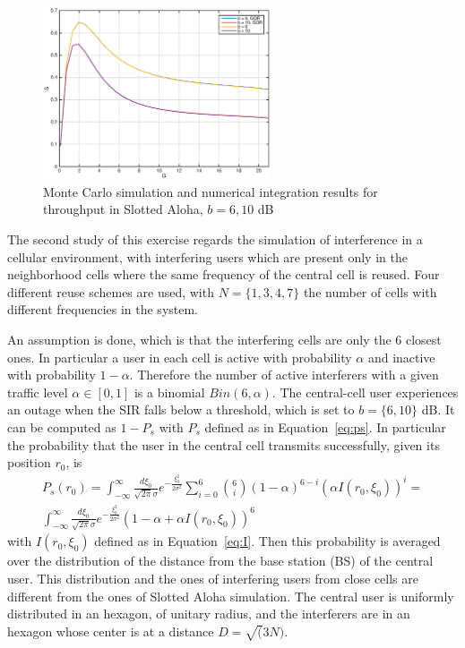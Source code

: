\documentclass[10pt]{article}
\begin{document}
\begin{figure}[h!]
  \centering
  \includegraphics[width = 0.6\textwidth]{aloha_GQR_S}
  \caption{Monte Carlo simulation and numerical integration results for throughput in Slotted Aloha, $b = 6, 10$ dB}
  \label{fig:aloha_GQR_S}
\end{figure}

The second study of this exercise regards the simulation of interference in a cellular environment, with interfering users which are present only in the neighborhood cells where the same frequency of the central cell is reused. Four different reuse schemes are used, with $N = \{1, 3, 4, 7\}$ the number of cells with different frequencies in the system.

An assumption is done, which is that the interfering cells are only the 6 closest ones. In particular a user in each cell is active with probability $\alpha$ and inactive with probability $1-\alpha$. Therefore the number of active interferers with a given traffic level $\alpha \in [0,1]$ is a binomial $Bin(6, \alpha)$. The central-cell user experiences an outage when the SIR falls below a threshold, which is set to $b = \{6, 10\}$ dB. It can be computed as $1 - P_{s}$ with $P_{s}$ defined as in Equation~\eqref{eq:ps}. In particular the probability that the user in the central cell transmits successfully, given its position $r_0$, is 
\begin{eqnarray}
  P_s(r_0) = \int_{-\infty}^{\infty} \frac{d\xi_0}{\sqrt{2\pi}\sigma} e^{-\frac{\xi_0^2}{2\sigma^2}} 
  \sum_{i = 0}^{6} \binom{6}{i} (1 - \alpha)^{6-i} \left(\alpha I(r_0, \xi_0) \right)^{i} = \\
  \int_{-\infty}^{\infty} \frac{d\xi_0}{\sqrt{2\pi}\sigma} e^{-\frac{\xi_0^2}{2\sigma^2}} (1 - \alpha + \alpha I(r_0, \xi_0))^6
  \label{eq:succ_cell}
\end{eqnarray}
with $I(r_0, \xi_0)$ defined as in Equation~\eqref{eq:I}. Then this probability is averaged over the distribution of the distance from the base station (BS) of the central user. This distribution and the ones of interfering users from close cells are different from the ones of Slotted Aloha simulation. The central user is uniformly distributed in an hexagon, of unitary radius, and the interferers are in an hexagon whose center is at a distance $D = \sqrt(3N)$. 
\end{document}
